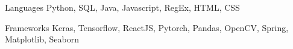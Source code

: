 
\begin{cvskills}
  \cvskill
    {Languages} %
    {Python, SQL, Java, Javascript, RegEx, HTML, CSS} %

  \cvskill
    {Frameworks} %
    {Keras, Tensorflow, ReactJS, Pytorch, Pandas, OpenCV, Spring, Matplotlib, Seaborn} %
    
\end{cvskills}
